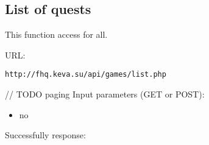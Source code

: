 \subsection{List of quests}
\par

This function access for all.

URL:
\begin{Verbatim}[frame=single]
http://fhq.keva.su/api/games/list.php
\end{Verbatim}

// TODO paging
Input parameters (GET or POST):
\begin{itemize}
  \item no
\end{itemize}

Successfully response:  \\
